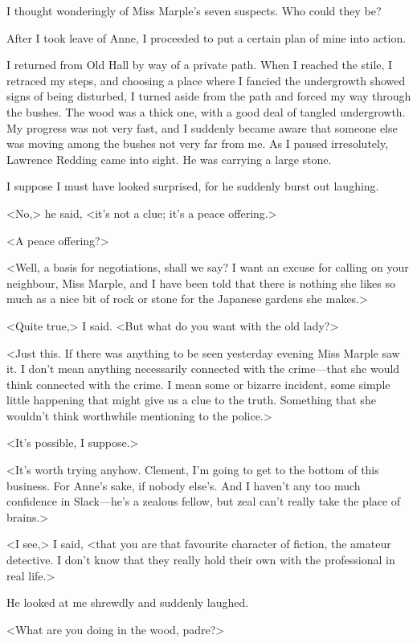 I thought wonderingly of Miss Marple's seven suspects. Who could they be?

After I took leave of Anne, I proceeded to put a certain plan of mine into action.

I returned from Old Hall by way of a private path. When I reached the stile, I retraced my steps, and choosing a place where I fancied the undergrowth showed signs of being disturbed, I turned aside from the path and forced my way through the bushes. The wood was a thick one, with a good deal of tangled undergrowth. My progress was not very fast, and I suddenly became aware that someone else was moving among the bushes not very far from me. As I paused irresolutely, Lawrence Redding came into sight. He was carrying a large stone.

I suppose I must have looked surprised, for he suddenly burst out laughing.

<No,> he said, <it's not a clue; it's a peace offering.>

<A peace offering?>

<Well, a basis for negotiations, shall we say? I want an excuse for calling on your neighbour, Miss Marple, and I have been told that there is nothing she likes so much as a nice bit of rock or stone for the Japanese gardens she makes.>

<Quite true,> I said. <But what do you want with the old lady?>

<Just this. If there was anything to be seen yesterday evening Miss Marple saw it. I don't mean anything necessarily connected with the crime—that she would think connected with the crime. I mean some  or bizarre incident, some simple little happening that might give us a clue to the truth. Something that she wouldn't think worthwhile mentioning to the police.>

<It's possible, I suppose.>

<It's worth trying anyhow. Clement, I'm going to get to the bottom of this business. For Anne's sake, if nobody else's. And I haven't any too much confidence in Slack—he's a zealous fellow, but zeal can't really take the place of brains.>

<I see,> I said, <that you are that favourite character of fiction, the amateur detective. I don't know that they really hold their own with the professional in real life.>

He looked at me shrewdly and suddenly laughed.

<What are you doing in the wood, padre?>


